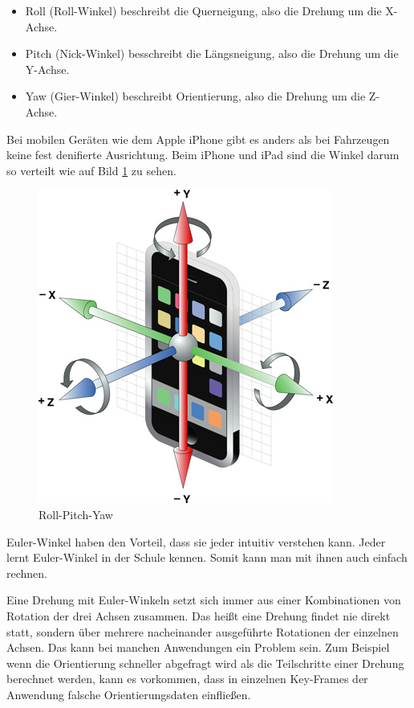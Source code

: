 \begin{itemize}
	\item Roll (Roll-Winkel) beschreibt die Querneigung, also die Drehung um die X-Achse.
	\item Pitch (Nick-Winkel) besschreibt die Längsneigung, also die Drehung um die Y-Achse.
	\item Yaw (Gier-Winkel) beschreibt Orientierung, also die Drehung um die Z-Achse.
\end{itemize}

Bei mobilen Geräten wie dem Apple iPhone gibt es anders als bei Fahrzeugen keine fest denifierte Ausrichtung. Beim iPhone und iPad sind die Winkel darum so verteilt wie auf Bild \ref{fig:apple-axes} zu sehen.

\begin{figure}[htb]
\centering
\includegraphics[scale=0.8]{figures/apple-axes}
\caption{Roll-Pitch-Yaw \cite{apple:001}}
\label{fig:apple-axes}
\end{figure}

Euler-Winkel haben den Vorteil, dass sie jeder intuitiv verstehen kann. Jeder lernt Euler-Winkel in der Schule kennen. Somit kann man mit ihnen auch einfach rechnen.

Eine Drehung mit Euler-Winkeln setzt sich immer aus einer Kombinationen von Rotation der drei Achsen zusammen. Das heißt eine Drehung findet nie direkt statt, sondern über mehrere nacheinander ausgeführte Rotationen der einzelnen Achsen. Das kann bei manchen Anwendungen ein Problem sein. Zum Beispiel wenn die Orientierung schneller abgefragt wird als die Teilschritte einer Drehung berechnet werden, kann es vorkommen, dass in einzelnen Key-Frames der Anwendung falsche Orientierungsdaten einfließen.


